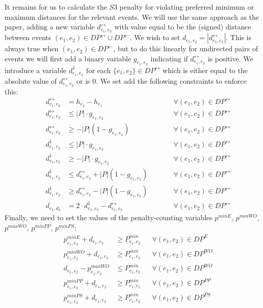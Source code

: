 \documentclass{article}
\newcommand{\set}[1]{%
  \left( #1 \right)
}
\begin{document}
It remains for us to calculate the $S3$ penalty for violating preferred minimum
or maximum distances for the relevant events. We will use the same approach as
the paper, adding a new variable $d^\leftrightarrow_{e_1, e_2}$ with value equal
to be the (signed) distance between events $(e_1, e_2) \in DP^\leftrightarrow
\cup DP^\leftarrow$. We wish to set $d_{e_1, e_2} =
|d^\leftrightarrow_{e_1, e_2}|$. This is always true when $(e_1, e_2) \in
DP^\leftarrow$, but to do this linearly for undirected pairs of events we will first add a
binary variable $g_{e_1, e_2}$ indicating if $d^\leftrightarrow_{e_1, e_2}$ is
positive. We introduce a variable $d^1_{e_1,e_2}$ for each $\{e_1, e_2\} \in
DP^\leftrightarrow$ which is either equal to the absolute value of
$d^\leftrightarrow_{e_1, e_2}$ or is 0. We set add the following constraints to
enforce this:
\begin{align}
    && d^\leftrightarrow_{e_1,e_2} & = h_{e_2} - h_{e_1} &&
        \qquad \forall \set{e_1,e_2} \in DP^\leftrightarrow \\
    && d^\leftrightarrow_{e_1,e_2} & \leq |P| \cdot g_{e_1,e_2} &&
        \qquad \forall \set{e_1,e_2} \in DP^\leftrightarrow \\
    && d^\leftrightarrow_{e_1,e_2} & \geq -|P| (1 - g_{e_1,e_2}) &&
        \qquad \forall \set{e_1,e_2} \in DP^\leftrightarrow \\
    && d^1_{e_1,e_2} & \leq |P| \cdot g_{e_1,e_2} &&
        \qquad \forall \set{e_1,e_2} \in DP^\leftrightarrow \\
    && d^1_{e_1,e_2} & \geq -|P| \cdot g_{e_1,e_2} &&
        \qquad \forall \set{e_1,e_2} \in DP^\leftrightarrow \\
    && d^1_{e_1,e_2} & \leq d^\leftrightarrow_{e_1,e_2} + |P| (1 - g_{e_1,e_2}) &&
        \qquad \forall \set{e_1,e_2} \in DP^\leftrightarrow \\
    && d^1_{e_1,e_2} & \geq d^\leftrightarrow_{e_1,e_2} - |P| (1 - g_{e_1,e_2}) &&
        \qquad \forall \set{e_1,e_2} \in DP^\leftrightarrow \\
    && d_{e_1, d_2} & = 2 \cdot d^1_{e_1,e_2} - d^\leftrightarrow_{e_1,e_2} &&
        \qquad \forall \set{e_1,e_2} \in DP^\leftrightarrow
\end{align}
Finally, we need to set the values of the penalty-counting variables $p^{minE}$,
$p^{minWO}$, $p^{maxWO}$, $p^{minPP}$, $p^{minPS}$:
\begin{align}
    && p^{minE}_{e_1,e_2} + d_{e_1,e_2} & \geq P^{min}_{e_1,e_2} &&
        \forall \set{e_1,e_2} \in DP^E \\
    && p^{minWO}_{e_1,e_2} + d_{e_1,e_2} & \geq P^{min}_{e_1,e_2} &&
        \forall \set{e_1,e_2} \in DP^{WO} \\
    && d_{e_1,e_2} - p^{maxWO}_{e_1,e_2} & \leq P^{min}_{e_1,e_2} &&
        \forall \set{e_1,e_2} \in DP^{WO} \\
    && p^{minPP}_{e_1,e_2} + d_{e_1,e_2} & \geq P^{min}_{e_1,e_2} &&
        \forall \set{e_1,e_2} \in DP^{PP} \\
    && p^{minPS}_{e_1,e_2} + d_{e_1,e_2} & \geq P^{min}_{e_1,e_2} &&
        \forall \set{e_1,e_2} \in DP^{PS}
\end{align}
\end{document}
